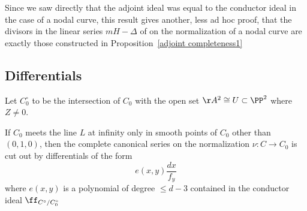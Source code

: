 Since we saw directly that the adjoint ideal was equal to the conductor ideal in the case of
a nodal curve, this result gives another, less ad hoc proof, that the 
divisors in the linear series $mH-\Delta$
of on the normalization of a nodal curve
are exactly those constructed in Proposition~\ref{adjoint completeness1}

\subsection{Differentials}

Let $C^\circ_0$ to be the intersection of $C_0$ with the open set $\AA^{2}\cong U\subset \PP^{2}$ where $Z \neq 0$.

\begin{theorem}\label{general differentials}
If $C_{0}$ meets the line $L$ at infinity only in smooth points of $C_{0}$ other than $(0,1,0)$, then the complete canonical series on the normalization $\nu: C \to C_{0}$ is cut out by differentials of the form
$$
e(x,y) \frac{dx}{f_{y}}
$$
where $e(x,y)$ is a polynomial of degree $\leq d-3$ contained in the 
conductor ideal $\ff_{C^{\circ}/C_{0}^{\circ}}$
\end{theorem}


